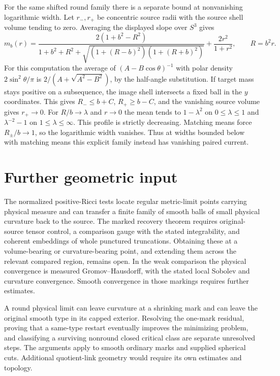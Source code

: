\documentclass[11pt]{article}
\theoremstyle{definition}
\theoremstyle{remark}
\begin{document}
For the same shifted round family there is a separate bound at nonvanishing logarithmic width. Let \(r_-,r_+\) be concentric source radii with the source shell volume tending to zero. Averaging the displayed slope over \(S^3\) gives
\[
 m_b(r)=\frac{2(1+b^2-R^2)}
 {1+b^2+R^2+\sqrt{(1+(R-b)^2)(1+(R+b)^2)}}+\frac{2r^2}{1+r^2},
 \qquad R=b^2r.
\]
For this computation the average of \((A-B\cos\theta)^{-1}\) with polar density \(2\sin^2\theta/\pi\) is \(2/(A+\sqrt{A^2-B^2})\), by the half-angle substitution. If target mass stays positive on a subsequence, the image shell intersects a fixed ball in the \(y\) coordinates. This gives \(R_-\le b+C\), \(R_+\ge b-C\), and the vanishing source volume gives \(r_+\to0\). For \(R/b\to\lambda\) and \(r\to0\) the mean tends to \(1-\lambda^2\) on \(0\le\lambda\le1\) and \(\lambda^{-2}-1\) on \(1\le\lambda\le\infty\). This profile is strictly decreasing. Matching means force \(R_\pm/b\to1\), so the logarithmic width vanishes. Thus at widths bounded below with matching means this explicit family instead has vanishing paired current.

\section{Further geometric input}

The normalized positive-Ricci tests locate regular metric-limit points carrying physical measure and can transfer a finite family of smooth balls of small physical curvature back to the source. The marked recovery theorem requires original-source tensor control, a comparison gauge with the stated integrability, and coherent embeddings of whole punctured truncations. Obtaining these at a volume-bearing or curvature-bearing point, and extending them across the relevant compared region, remains open. In the weak comparison the physical convergence is measured Gromov--Hausdorff, with the stated local Sobolev and curvature convergence. Smooth convergence in those markings requires further estimates.

A round physical limit can leave curvature at a shrinking mark and can leave the original smooth type in its capped exterior. Resolving the one-mark residual, proving that a same-type restart eventually improves the minimizing problem, and classifying a surviving nonround closed critical class are separate unresolved steps. The arguments apply to smooth ordinary marks and supplied spherical cuts. Additional quotient-link geometry would require its own estimates and topology.
\end{document}
